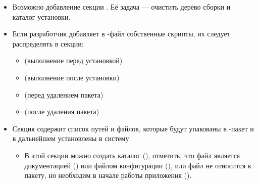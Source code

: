 \begin{itemize}
	\item Возможно добавление секции . Её задача --- очистить дерево сборки и каталог установки.
	
	\item Если разработчик добавляет в -файл собственные скрипты, их следует распределять в секции: 
	\begin{itemize}
		\item {} (выполнение перед установкой)
		\item {} (выполнение после установки)
		\item {} (перед удалением пакета)
		\item {} (после удаления пакета)
	\end{itemize}
	
	\item Секция  содержит список путей и файлов, которые будут упакованы в -пакет и в дальнейшем установлены в систему.
	\begin{itemize}
		\item В этой секции можно создать каталог (), отметить, что файл является документацией () или файлом конфигурации (), или файл не относится к пакету, но необходим в начале работы приложения ().
	\end{itemize} 
\end{itemize}




